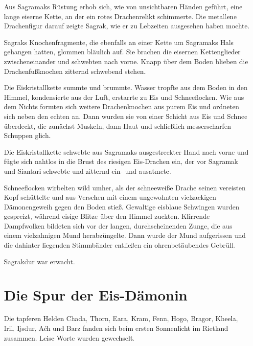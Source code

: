 Aus Sagramaks Rüstung erhob sich, wie von unsichtbaren Händen geführt, eine lange eiserne Kette, an der ein rotes Drachenrelikt schimmerte. Die metallene Drachenfigur darauf zeigte Sagrak, wie er zu Lebzeiten ausgesehen haben mochte.

Sagraks Knochenfragmente, die ebenfalls an einer Kette um Sagramaks Hals gehangen hatten, glommen bläulich auf. Sie brachen die eisernen Kettenglieder zwischeneinander und schwebten nach vorne. Knapp über dem Boden blieben die Drachenfußknochen zitternd schwebend stehen.

Die Eiskristallkette summte und brummte. Wasser tropfte aus dem Boden in den Himmel, kondensierte aus der Luft, erstarrte zu Eis und Schneeflocken. Wie aus dem Nichts formten sich weitere Drachenknochen aus purem Eis und ordneten sich neben den echten an. Dann wurden sie von einer Schicht aus Eis und Schnee überdeckt, die zunächst Muskeln, dann Haut und schließlich messerscharfen Schuppen glich.

Die Eiskristallkette schwebte aus Sagramaks ausgestreckter Hand nach vorne und fügte sich nahtlos in die Brust des riesigen Eis-Drachen ein, der vor Sagramak und Siantari schwebte und zitternd ein- und ausatmete.

Schneeflocken wirbelten wild umher, als der schneeweiße Drache seinen vereisten Kopf schüttelte und aus Versehen mit einem ungewohnten vielzackigen Dämonengeweih gegen den Boden stieß. Gewaltige eisblaue Schwingen wurden gespreizt, während eisige Blitze über den Himmel zuckten. Klirrende Dampfwolken bildeten sich vor der langen, durchscheinenden Zunge, die aus einem vielzahnigen Mund herabzüngelte. Dann wurde der Mund aufgerissen und die dahinter liegenden Stimmbänder entließen ein ohrenbetäubendes Gebrüll.

Sagrakdur war erwacht.




















\newpage
\section{Die Spur der Eis-Dämonin}




Die tapferen Helden Chada, Thorn, Eara, Kram, Fenn, Hogo, Bragor, Kheela, Iril, Ijsdur, Aćh und Barz fanden sich beim ersten Sonnenlicht im Rietland zusammen. Leise Worte wurden gewechselt.

